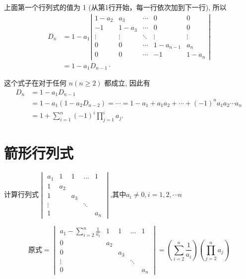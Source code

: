 \begin{solution}
上面第一个行列式的值为 1 (从第1行开始，每一行依次加到下一行), 所以
$$
\begin{aligned}
D_{n} &=1-a_{1}\left|\begin{array}{ccccc}
1-a_{2} & a_{3} & \cdots & 0 & 0 \\
-1 & 1-a_{3} & \cdots & 0 & 0 \\
\vdots & \vdots & \ddots & \vdots & \vdots \\
0 & 0 & \cdots & 1-a_{n-1} & a_{n} \\
0 & 0 & \cdots & -1 & 1-a_{n}
\end{array}\right| \\
&=1-a_{1} D_{n-1} \cdot
\end{aligned}
$$

这个式子在对于任何 $n(n \geq 2)$ 都成立, 因此有
$$
\begin{aligned}
D_{n} &=1-a_{1} D_{n-1} \\
&=1-a_{1}\left(1-a_{2} D_{n-2}\right)=\cdots=1-a_{1}+a_{1} a_{2}+\cdots+(-1)^n a_{1} a_{2} \cdots a_{n} \\
&=1+\sum_{i=1}^{n}(-1)^i \prod_{j=1}^{i} a_{j} .
\end{aligned}
$$
\end{solution}

\section{箭形行列式}

\begin{example}
    计算行列式$\begin{vmatrix}
        a_1 &1&1&\ldots&1\\
        1&a_2\\
        1&&a_3\\
        \vdots&&&\ddots\\
        1&&&&a_n
        \end{vmatrix}$,其中$a_i\neq 0,i=1,2,\cdots n$        
\end{example}

\begin{solution}
    $$
\text{原式}=\begin{vmatrix}
a_1-\displaystyle\sum_{i=2}^n\frac{1}{a_i} &1&1&\ldots&1\\
0&a_2\\
0&&a_3\\
\vdots&&&\ddots\\
0&&&&a_n
\end{vmatrix}
=\left(\sum_{i=2}^n\frac{1}{a_i}\right)
\left(\prod_{j=2}^na_j\right)
$$
\end{solution}

